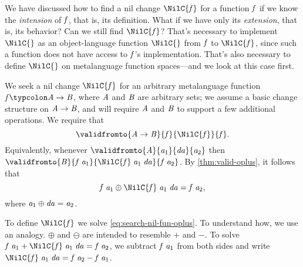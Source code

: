 We have discussed how to find a nil change \ensuremath{\NilC{\Varid{f}}} for a function
\ensuremath{\Varid{f}} if we know the \emph{intension} of \ensuremath{\Varid{f}}, that is, its
definition. What if we have only its \emph{extension}, that is,
its behavior? Can we still find \ensuremath{\NilC{\Varid{f}}}?
That's necessary to implement \ensuremath{\NilC{}} as an
object-language function \ensuremath{\NilC{}} from \ensuremath{\Varid{f}} to \ensuremath{\NilC{\Varid{f}}}, since such a
function does not have access to \ensuremath{\Varid{f}}'s implementation. That's
also necessary to define \ensuremath{\NilC{}} on metalanguage function spaces---and we look at this case first.

We seek a nil change \ensuremath{\NilC{\Varid{f}}} for an arbitrary
metalanguage function \ensuremath{\Varid{f}\typcolon\Conid{A}\to \Conid{B}}, where \ensuremath{\Conid{A}} and \ensuremath{\Conid{B}} are
arbitrary sets; we assume a basic change structure on \ensuremath{\Conid{A}\to \Conid{B}},
and will require \ensuremath{\Conid{A}} and \ensuremath{\Conid{B}} to support a few additional
operations. We require that
\begin{equation}
  \label{eq:search-nil-fun}
  \ensuremath{\validfromto{\Conid{A}\to \Conid{B}}{\Varid{f}}{\NilC{\Varid{f}}}{\Varid{f}}}.
\end{equation}
Equivalently, whenever \ensuremath{\validfromto{\Conid{A}}{\Varid{a}_{1}}{\Varid{da}}{\Varid{a}_{2}}} then \ensuremath{\validfromto{\Conid{B}}{\Varid{f}\;\Varid{a}_{1}}{\NilC{\Varid{f}}\;\Varid{a}_{1}\;\Varid{da}}{\Varid{f}\;\Varid{a}_{2}}}. By \cref{thm:valid-oplus}, it follows that
\begin{equation}
  \label{eq:search-nil-fun-oplus}
  \ensuremath{\Varid{f}\;\Varid{a}_{1}\oplus \NilC{\Varid{f}}\;\Varid{a}_{1}\;\Varid{da}\mathrel{=}\Varid{f}\;\Varid{a}_{2}},
\end{equation}
where \ensuremath{\Varid{a}_{1}\oplus \Varid{da}\mathrel{=}\Varid{a}_{2}}.

To define \ensuremath{\NilC{\Varid{f}}} we solve \cref{eq:search-nil-fun-oplus}. To understand how, we
use an analogy.
\ensuremath{\oplus } and \ensuremath{\ominus } are intended to resemble \ensuremath{\mathbin{+}} and \ensuremath{\mathbin{-}}.
To solve \ensuremath{\Varid{f}\;\Varid{a}_{1}\mathbin{+}\NilC{\Varid{f}}\;\Varid{a}_{1}\;\Varid{da}\mathrel{=}\Varid{f}\;\Varid{a}_{2}}, we subtract \ensuremath{\Varid{f}\;\Varid{a}_{1}}
from both sides and write \ensuremath{\NilC{\Varid{f}}\;\Varid{a}_{1}\;\Varid{da}\mathrel{=}\Varid{f}\;\Varid{a}_{2}\mathbin{-}\Varid{f}\;\Varid{a}_{1}}.

